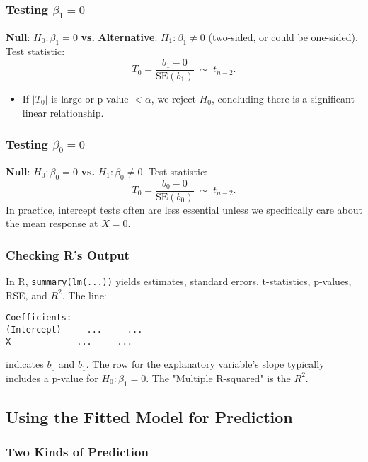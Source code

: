 \documentclass[10pt, total={6in, 8in}]{extarticle}
\begin{document}
\subsubsection{Testing $\beta_1 = 0$}

\textbf{Null}: $H_0: \beta_1 = 0$ \quad \textbf{vs.} \quad \textbf{Alternative}: $H_1: \beta_1\neq0$ (two-sided, or could be one-sided).
Test statistic:
\[
    T_0 = \frac{b_1 - 0}{\text{SE}(b_1)} \;\sim\; t_{n-2}.
\]
\begin{itemize}
    \item If $\lvert T_0\rvert$ is large or p-value $< \alpha$, we reject $H_0$, concluding there is a significant linear relationship.
\end{itemize}

\subsubsection{Testing $\beta_0 = 0$}

\textbf{Null}: $H_0: \beta_0=0$ \quad \textbf{vs.} \quad $H_1: \beta_0\neq0$.
Test statistic:
\[
    T_0 = \frac{b_0 - 0}{\text{SE}(b_0)} \;\sim\; t_{n-2}.
\]
In practice, intercept tests often are less essential unless we specifically care about the mean response at $X=0$.

\subsubsection{Checking R's Output}

In R, \texttt{summary(lm(...))} yields estimates, standard errors, t-statistics, p-values, RSE, and $R^2$. The line:

\begin{verbatim}
Coefficients:
(Intercept)     ...     ...
X             ...     ...
\end{verbatim}

indicates $b_0$ and $b_1$. The row for the explanatory variable's slope typically includes a p-value for $H_0: \beta_1=0$. The "Multiple R-squared" is the $R^2$.



\subsection{Using the Fitted Model for Prediction}

\subsubsection{Two Kinds of Prediction}
\end{document}
